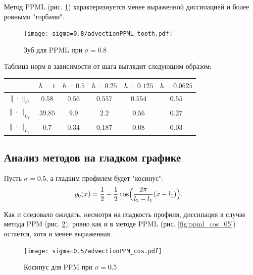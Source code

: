 \documentclass[12pt,a4paper]{article}
\newcommand{\picref}[1]{рис. \ref{#1}}
\begin{document}
    \pagebreak

    Метод PPML (\picref{fig:ppml_tooth_08}) характеризиуется менее выраженной диссипацией и более ровными "горбами". 

    \begin{figure}[h]
        \centering
        \texttt{[image: sigma=0.8/advectionPPML\_tooth.pdf]}
        \caption{Зуб для PPML при $ \sigma = 0.8 $}
        \label{fig:ppml_tooth_08}
    \end{figure}

    Таблица норм в зависимости от шага выглядит следующим образом:

    \begin{center}
        \begin{tabular}{ |c|c|c|c|c|c| } 
         \hline
         & $ h=1 $ &  $ h=0.5$ &  $ h=0.25 $ &  $ h=0.125 $ &  $ h=0.0625 $ 
         \\ 
         \hline
         $\| \cdot \|_{C}$ & $0.58$ & $0.56$ & $0.557$ & $0.554$ & $0.55$ 
         \\
         \hline
         $\| \cdot \|_{L_1}$ & $39.85$ & $9.9$ & $2.2$ & $0.56$ & $0.27$
         \\
         \hline
         $\| \cdot \|_{L_2}$ & $0.7$ & $0.34$ & $0.187$ & $0.08$ & $0.03$ 
         \\
         \hline
        \end{tabular}
    \end{center}

    \subsection{Анализ методов на гладком графике}

    Пусть $ \sigma = 0.5 $, а гладким профилем будет "косинус":
    \[
        y_0(x) = \dfrac{1}{2} - \dfrac{1}{2} \cos\Bigl(\dfrac{2 \pi}{l_2 - l_1}(x-l_1)\Bigr).
    \]

    Как и следовало ожидать, несмотря на гладкость профиля, диссипация в случае метода PPM (\picref{fig:ppm_cos_05}), ровно как и в методе PPML (\picref{fig:ppml_cos_05}) остается, хотя и менее выраженная. 

    \pagebreak

    \begin{figure}[h]
        \centering
        \texttt{[image: sigma=0.5/advectionPPM\_cos.pdf]}
        \caption{Косинус для PPM при $ \sigma = 0.5 $}
        \label{fig:ppm_cos_05}
    \end{figure}
\end{document}

